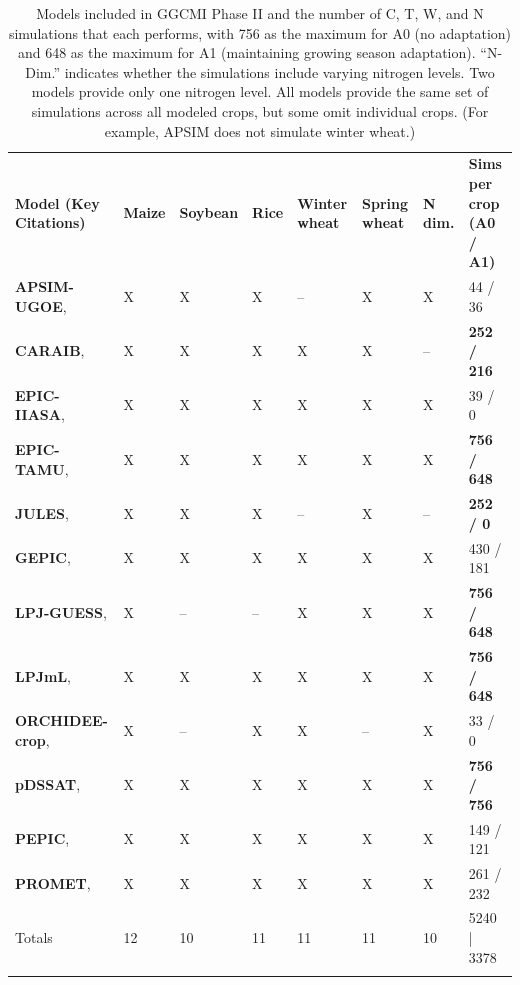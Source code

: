 \documentclass[gmd, manuscript]{copernicus} %
\begin{document}
\begin{table}[t]
\caption{Models included in GGCMI Phase II and the number of C, T, W, and N simulations that each performs, with 756 as the maximum for A0 (no adaptation) and 648 as the maximum for A1 (maintaining growing season adaptation). 
``N-Dim.'' indicates whether the simulations include varying nitrogen levels. Two models provide only one nitrogen level. 
All models provide the same set of simulations across all modeled crops, but some omit individual crops. (For example, APSIM does not simulate winter wheat.)}
\label{table:models}
	\begin{tabular}{p{6cm} p{1cm} p{1cm} p{1cm} p{1cm} p{1cm} p{1cm} p{1.9cm}}
        \tophline
		{\textbf{Model (Key Citations)}}&{\textbf{Maize}}&{\textbf{Soybean}}&{\textbf{Rice}}&{\textbf{Winter wheat}}&{\textbf{Spring wheat}}&{\textbf{N dim.}}&{\textbf{Sims per crop (A0 / A1)}}\\ \middlehline
        {\textbf{APSIM-UGOE},   \citet{KEATING2003267, HOLZWORTH2014327}} & {X} & {X} & {X} & {--} & {X} & {X} & {44 / 36}\\ \middlehline
        {\textbf{CARAIB},       \citet{Dury2011, Pirttioja2015}} & {X} & {X} & {X} & {X} & {X} & {--} & {\textbf{252 / 216}}\\ \middlehline
        {\textbf{EPIC-IIASA},   \citet{BALKOVIC2014}} & {X} & {X} & {X} & {X} & {X} & {X} & {39 / 0}\\  \middlehline
        {\textbf{EPIC-TAMU},    \citet{Izaurralde06}} & {X} & {X} & {X} & {X} & {X} & {X} & {\textbf{756 / 648}}\\ \middlehline
        {\textbf{JULES},        \citet{Osborne2015, Williams2015, Williams2017}} & {X} & {X} & {X} & {--} & {X} & {--} & {\textbf{252 / 0}}\\ \middlehline
        {\textbf{GEPIC},        \citet{LIU2007478, FOLBERTH201221}} & {X} & {X} & {X} & {X} & {X} & {X} & {430 / 181}\\ \middlehline
        {\textbf{LPJ-GUESS},    \citet{Lindeskog2013, Olin2015}} & {X} & {--} & {--} & {X} & {X} & {X} & {\textbf{756 / 648}}\\  \middlehline
        {\textbf{LPJmL},        \citet{von_Bloh_implementing_2018}} & {X} & {X} & {X} & {X} & {X} & {X} & {\textbf{756 / 648}}\\ \middlehline
        {\textbf{ORCHIDEE-crop},\citet{Wu2016}} & {X} & {--} & {X} & {X} & {--} & {X} & {33 / 0}\\ \middlehline
        {\textbf{pDSSAT},       \citet{Elliott2014b, JONES2003235}} & {X} & {X} & {X} & {X} & {X} & {X} & {\textbf{756 / 756}}\\ \middlehline
        {\textbf{PEPIC},        \citet{LIU2016164, LIU2016}} & {X} & {X} & {X} & {X} & {X} & {X} & {149 / 121}\\ \middlehline
        {\textbf{PROMET},       \citet{Hank2015, MAUSER2015}} & {X} & {X} & {X} & {X} & {X} & {X} & {261 / 232}\\ \middlehline
        {Totals} & {12} & {10} & {11} & {11} & {11} & {10} & {5240 | 3378}\\
        \bottomhline
    \end{tabular}
\end{table}
\end{document}
